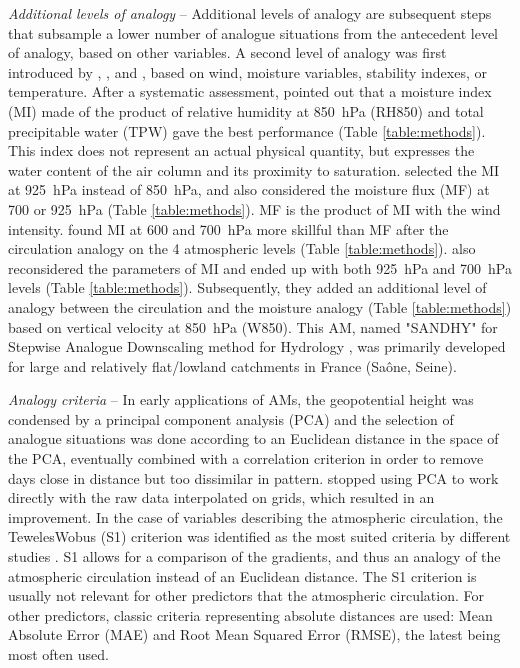 \documentclass[review]{elsarticle}
\begin{document}
\textit{Additional levels of analogy} -- Additional levels of analogy are subsequent steps that subsample a lower number of analogue situations from the antecedent level of analogy, based on other variables. A second level of analogy was first introduced by \citet{Mandon1985}, \citet{Vallee1986}, and \citet{Gibergans-Baguena2007}, based on wind, moisture variables, stability indexes, or temperature. After a systematic assessment, \citet{Bontron2004} pointed out that a moisture index (MI) made of the product of relative humidity at 850~hPa (RH850) and total precipitable water (TPW) gave the best performance (Table \ref{table:methods}). This index does not represent an actual physical quantity, but expresses the water content of the air column and its proximity to saturation. \citet{Marty2010} selected the MI at 925~hPa instead of 850~hPa, and also considered the moisture flux (MF) at 700 or 925~hPa (Table \ref{table:methods}). MF is the product of MI with the wind intensity. \citet{Horton2018a} found MI at 600 and 700~hPa more skillful than MF after the circulation analogy on the 4 atmospheric levels (Table \ref{table:methods}). \citet{BenDaoud2016} also reconsidered the parameters of MI and ended up with both 925~hPa and 700~hPa levels (Table \ref{table:methods}). Subsequently, they added an additional level of analogy between the circulation and the moisture analogy (Table \ref{table:methods}) based on vertical velocity at 850~hPa (W850). This AM, named "SANDHY" for Stepwise Analogue Downscaling method for Hydrology \citep{BenDaoud2016, Caillouet2016}, was primarily developed for large and relatively flat/lowland catchments in France (Sa\^{o}ne, Seine).

\textit{Analogy criteria} -- In early applications of AMs, the geopotential height was condensed by a principal component analysis (PCA) and the selection of analogue situations was done according to an Euclidean distance in the space of the PCA, eventually combined with a correlation criterion in order to remove days close in distance but too dissimilar in pattern. \citet{Guilbaud1997} stopped using PCA to work directly with the raw data interpolated on grids, which resulted in an improvement. In the case of variables describing the atmospheric circulation, the Teweles\textendash Wobus (S1) criterion \citep[Eq. (\ref{eq:S1}), ][]{Teweles1954, Drosdowsky2003} was identified as the most suited criteria by different studies \citep{Wilson1980, Woodcock1980, Guilbaud1998, Bontron2004}. S1 allows for a comparison of the gradients, and thus an analogy of the atmospheric circulation instead of an Euclidean distance. The S1 criterion is usually not relevant for other predictors that the atmospheric circulation. For other predictors, classic criteria representing absolute distances are used: Mean Absolute Error (MAE) and Root Mean Squared Error (RMSE), the latest being most often used.
\end{document}
